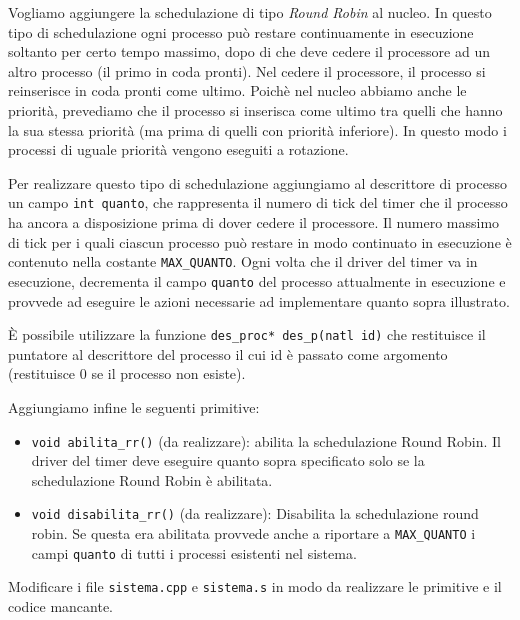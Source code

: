 Vogliamo aggiungere la schedulazione di tipo {\em Round Robin} al nucleo.
In questo tipo di schedulazione ogni processo pu\`o restare continuamente in esecuzione
soltanto per certo tempo massimo, dopo di che deve cedere il processore ad un altro processo
(il primo in coda pronti). 
Nel cedere il processore, il processo si reinserisce in coda pronti come ultimo.
Poich\`e nel nucleo abbiamo anche le priorit\`a, prevediamo che il processo si inserisca come ultimo
tra quelli che hanno la sua stessa priorit\`a (ma prima di quelli con priorit\`a inferiore).
In questo modo i processi  di uguale priorit\`a vengono eseguiti a rotazione.

Per realizzare questo tipo di schedulazione aggiungiamo al descrittore di processo un campo \verb|int quanto|, 
che rappresenta il numero di tick del timer che il processo ha ancora a disposizione prima di dover cedere
il processore. Il numero massimo di tick per i quali ciascun processo pu\`o restare in modo continuato in esecuzione
\`e contenuto nella costante \verb|MAX_QUANTO|.
Ogni volta che il driver del timer va in esecuzione, decrementa il campo \verb|quanto| del processo 
attualmente in esecuzione e provvede ad eseguire le azioni necessarie ad implementare quanto
sopra illustrato.

\`E possibile utilizzare la funzione \verb|des_proc* des_p(natl id)| che restituisce il puntatore
al descrittore del processo il cui id \`e passato come argomento (restituisce 0 se il processo non esiste).

Aggiungiamo infine le seguenti primitive:
\begin{itemize}
\item \verb|void abilita_rr()| (da realizzare): abilita la schedulazione Round Robin.
	Il driver del timer deve eseguire quanto sopra specificato solo se la schedulazione Round Robin \`e
	abilitata.
\item \verb|void disabilita_rr()| (da realizzare):
	Disabilita la schedulazione round robin. Se questa era abilitata provvede anche a riportare
	a \verb|MAX_QUANTO| i campi \verb|quanto| di tutti i processi esistenti nel sistema.
\end{itemize}

Modificare i file \verb|sistema.cpp| e \verb|sistema.s| in modo da realizzare le primitive e il codice mancante.
